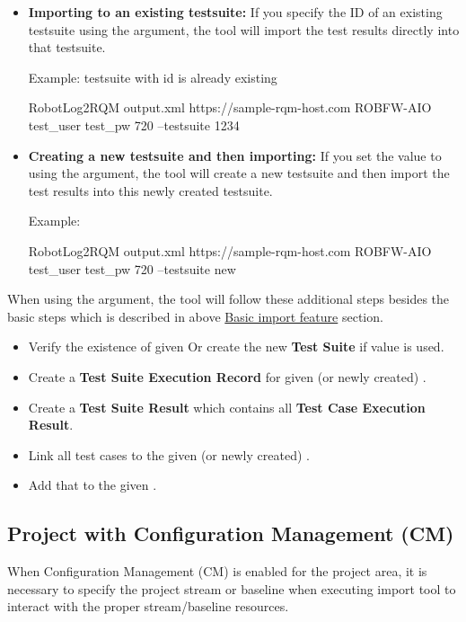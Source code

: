 \begin{itemize}
  \item \textbf{Importing to an existing testsuite:}
        If you specify the ID of an existing testsuite using the
         argument, the tool will import the
        test results directly into that testsuite.

        Example: testsuite with id  is already existing
        \begin{robotlog}
RobotLog2RQM output.xml https://sample-rqm-host.com ROBFW-AIO test_user test_pw 720 --testsuite 1234
        \end{robotlog}

  \item \textbf{Creating a new testsuite and then importing:}
        If you set the value to  using the 
        argument, the tool will create a new testsuite and then import the
        test results into this newly created testsuite.

        Example:
        \begin{robotlog}
RobotLog2RQM output.xml https://sample-rqm-host.com ROBFW-AIO test_user test_pw 720 --testsuite new
        \end{robotlog}
\end{itemize}

When using the  argument, the tool will follow these
additional steps besides the basic steps which is described in above
\hyperref[basic-features]{Basic import feature} section.
\begin{itemize}
  \item Verify the existence of given 
        Or create the new \textbf{Test Suite} if  value is used.
  \item Create a \textbf{Test Suite Execution Record} for given (or newly created) .
  \item Create a \textbf{Test Suite Result} which contains all \textbf{Test Case Execution Result}.
  \item Link all test cases to the given (or newly created) .
  \item Add that  to the given .
\end{itemize}

\subsection{Project with Configuration Management (CM)}
When Configuration Management (CM) is enabled for the project area,
it is necessary to specify the project stream or baseline when executing import
tool to interact with the proper stream/baseline resources.

